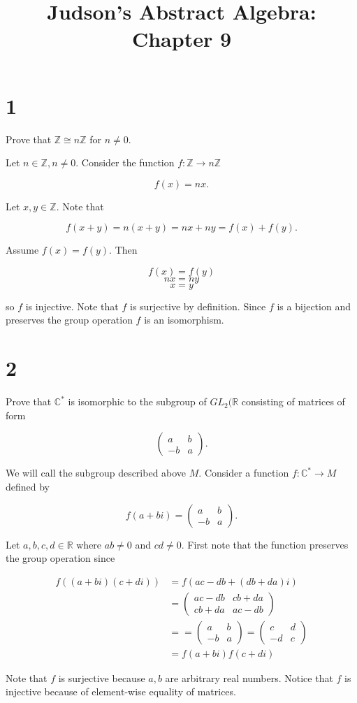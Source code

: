 \documentclass[a4paper]{article}
\title{Judson's Abstract Algebra: Chapter 9}
\date{}
\begin{document}
\maketitle

\section*{1}

Prove that $\mathbb{Z} \cong n \mathbb{Z}$ for $n \neq 0$.

\vspace{\baselineskip}

Let $n \in \mathbb{Z}, n \neq 0$. Consider the function $f : \mathbb{Z} \rightarrow n \mathbb{Z}$

$$f(x) = nx.$$

Let $x,y \in \mathbb{Z}$. Note that 

$$f(x+y) = n(x+y) = nx + ny = f(x) + f(y).$$

Assume $f(x) = f(y)$. Then

$$f(x) = f(y)$$
$$nx = ny$$
$$x = y$$

so $f$ is injective. Note that $f$ is surjective by definition. Since $f$ is a bijection and preserves the group operation $f$ is an isomorphism.


\section*{2} 

Prove that $\mathbb{C}^*$ is isomorphic to the subgroup of $GL_2(\mathbb{R}$ consisting of matrices of form

$$
  \begin{pmatrix}
    a & b \\
    -b & a
  \end{pmatrix}.$$
  
We will call the subgroup described above $M$. Consider a function $f : \mathbb{C}^* \rightarrow M$ defined by 

$$f(a+bi) = \begin{pmatrix}
    a & b \\
    -b & a
  \end{pmatrix}.$$
  
Let $a,b,c,d \in \mathbb{R}$ where $ab \neq 0$ and $cd \neq 0$. First note that the function preserves the group operation since

\begin{align*}
f((a+bi)(c+di)) &= f(ac-db + (db + da)i) \\
&= \begin{pmatrix}
    ac-db & cb + da \\
    cb + da & ac - db
  \end{pmatrix} \\
&= = \begin{pmatrix}
    a & b \\
    -b & a
  \end{pmatrix}
  = \begin{pmatrix}
    c & d \\
    -d & c
  \end{pmatrix} \\
&= f(a+bi)f(c+di)
\end{align*}

Note that $f$ is surjective because $a,b$ are arbitrary real numbers. Notice that $f$ is injective because of element-wise equality of matrices.
\end{document}
